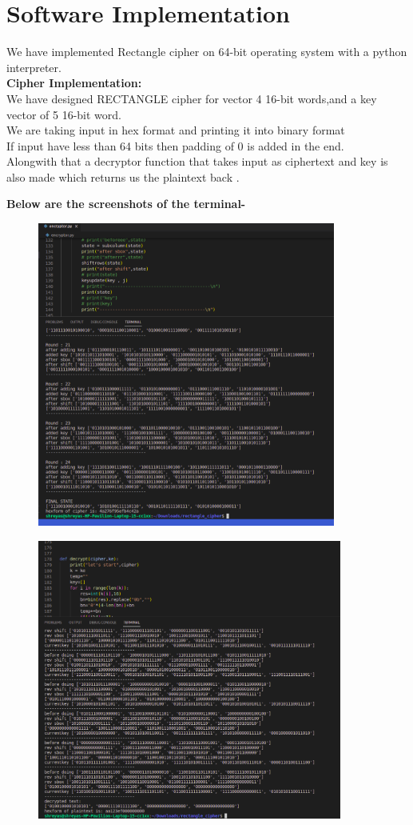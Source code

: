 \documentclass[journal=tosc,preprint]{iacrtrans}
\begin{document}
\vspace{10cm}
\section{Software Implementation}
We have implemented Rectangle cipher on 64-bit operating system with a python interpreter.\\
\textbf{Cipher Implementation: }\\
We have designed RECTANGLE cipher for vector 4 16-bit words,and a key vector of 5 16-bit word.\\
We are taking input in hex format and printing it into binary format\\
If input have less than 64 bits then padding of 0 is added in the end.\\
Alongwith that a decryptor function that takes input as ciphertext and key  is also made which returns us the plaintext back .

\textbf{Below are the screenshots of the terminal-}\\

\begin{figure}[htp]
    \centering
    \includegraphics[height=10cm]{img_11.png}
\end{figure}


\begin{figure}[htp]
    \centering
    \includegraphics[width=10cm]{img_12.png}
\end{figure}
\end{document}
